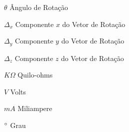 
\begin{simbolos}
    \item[$ \theta $] Ângulo de Rotação
    \item[$ \Delta_x $] Componente $x$ do Vetor de Rotação
    \item[$ \Delta_y $] Componente $y$ do Vetor de Rotação
    \item[$ \Delta_z $] Componente $z$ do Vetor de Rotação
    \item[$K\Omega$] Quilo-ohms
    \item[$V$] Volts
    \item[$mA$] Miliampere    
    \item[$\degree$] Grau
\end{simbolos}
